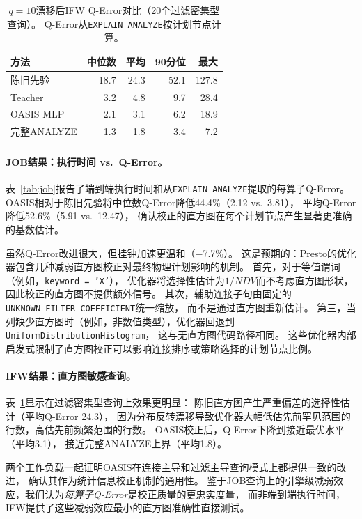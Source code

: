 \documentclass[runningheads]{llncs}
\begin{document}
\begin{table}[t]
  \centering
  \caption{$q{=}10$漂移后IFW Q-Error对比（20个过滤密集型查询）。
           Q-Error从\texttt{EXPLAIN ANALYZE}按计划节点计算。}
  \label{tab:ifw}
  \setlength{\tabcolsep}{4pt}
  \begin{tabular}{l rrrr}
    \toprule
    方法 & 中位数 & 平均 & 90分位 & 最大 \\
    \midrule
    陈旧先验    & 18.7 & 24.3 & 52.1  & 127.8 \\
    Teacher        & 3.2  & 4.8  & 9.7   & 28.4  \\
    OASIS MLP      & 2.1  & 3.1  & 6.2   & 18.9  \\
    完整ANALYZE   & 1.3  & 1.8  & 3.4   & 7.2   \\
    \bottomrule
  \end{tabular}
\end{table}

\paragraph{JOB结果：执行时间 vs.\ Q-Error。}
表~\ref{tab:job}报告了端到端执行时间和从\texttt{EXPLAIN ANALYZE}提取的每算子Q-Error。
OASIS相对于陈旧先验将中位数Q-Error降低44.4\%（2.12 vs.\ 3.81），
平均Q-Error降低52.6\%（5.91 vs.\ 12.47），
确认校正的直方图在每个计划节点产生显著更准确的基数估计。

虽然Q-Error改进很大，但挂钟加速更温和（$-$7.7\%）。
这是预期的：Presto的优化器包含几种减弱直方图校正对最终物理计划影响的机制。
首先，对于等值谓词（例如，\texttt{keyword = 'X'}），
优化器将选择性估计为$1/\mathit{NDV}$而不考虑直方图形状，
因此校正的直方图不提供额外信号。
其次，辅助连接子句由固定的\texttt{UNKNOWN\_FILTER\_COEFFICIENT}统一缩放，
而不是通过直方图重新估计。
第三，当列缺少直方图时（例如，非数值类型），优化器回退到\texttt{UniformDistributionHistogram}，
这与无直方图代码路径相同。
这些优化器内部启发式限制了直方图校正可以影响连接排序或策略选择的计划节点比例。

\paragraph{IFW结果：直方图敏感查询。}
表~\ref{tab:ifw}显示在过滤密集型查询上效果更明显：
陈旧直方图产生严重偏差的选择性估计（平均Q-Error 24.3），
因为分布反转漂移导致优化器大幅低估先前罕见范围的行数，高估先前频繁范围的行数。
OASIS校正后，Q-Error下降到接近最优水平（平均3.1），
接近完整ANALYZE上界（平均1.8）。

两个工作负载一起证明OASIS在连接主导和过滤主导查询模式上都提供一致的改进，
确认其作为统计信息校正机制的通用性。
鉴于JOB查询上的引擎级减弱效应，我们认为\emph{每算子Q-Error}是校正质量的更忠实度量，
而非端到端执行时间，IFW提供了这些减弱效应最小的直方图准确性直接测试。
\end{document}
